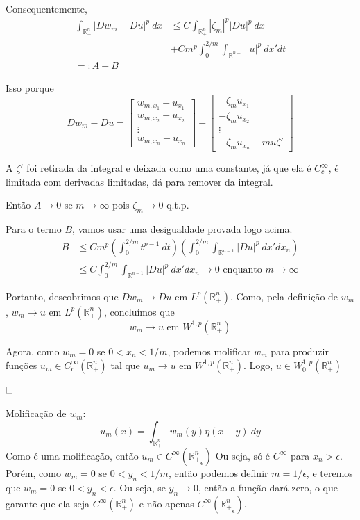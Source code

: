 \documentclass[11pt]{article}
\newcommand{\qed}{$\hfill\square$}
\newcommand{\R}{\mathbb{R}}
\newcommand{\e}{\epsilon}
\begin{document}
Consequentemente, \begin{align*}
	 \int_{\R^n_+} |Dw_m - Du|^p\ dx &\leq C \int_{\R^n_+} |\zeta_m|^p |Du|^p \ dx  \\
	  & +Cm^p \int_0^{2/m} \int_{\R^{n-1}} |u|^p \ dx'dt \\
	 =: A + B
\end{align*}

Isso porque \[ Dw_m - Du = \begin{bmatrix}
	w_{m, x_1} - u_{x_1} \\
		w_{m, x_2} - u_{x_2} \\
	\vdots \\
	w_{m, x_n} - u_{x_n}
\end{bmatrix}  - \begin{bmatrix}
- \zeta_m u_{x_1} \\
-\zeta_m u_{x_2} \\
\vdots \\
-\zeta_m u_{x_n} - mu\zeta'
\end{bmatrix}\] 

A $ \zeta' $ foi retirada da integral e deixada como uma constante, já que ela é $C^\infty_c$, é limitada com derivadas limitadas, dá para remover da integral.


Então $A\rightarrow 0$ se $m\rightarrow \infty$ pois $\zeta_m \rightarrow 0$ q.t.p.

Para o termo $B$, vamos usar uma desigualdade provada logo acima. \begin{align*}
	B &\leq C m^p \left(\int_0^{2/m} t^{p-1}\ dt\right)\left(\int_0^{2/m} \int_{\R^{n-1}} |Du|^p \ dx' dx_n\right) \\
	&\leq C \int_0^{2/m} \int_{\R^{n-1}} |Du|^p \ dx'dx_n \rightarrow 0 \text{ enquanto } m \rightarrow \infty
\end{align*}

Portanto, descobrimos que $ Dw_m \rightarrow Du \text{ em } L^{p}(\R^n_+)$. Como, pela definição de $w_m$, $w_m\rightarrow u \text{ em } L^p(\R^n_+)$, concluímos que \[ w_m \rightarrow u \text{ em } W^{1,p}(\R^n_+) \]

Agora, como $ w_m=0 $ se $ 0 < x_n < 1/m $, podemos molificar $ w_m $ para produzir funções $ u_m \in C^\infty_c(\R^n_+) $ tal que $ u_m \rightarrow u \text{ em } W^{1,p}(\R^n_+)$. Logo, $ u \in W^{1,p}_0 (\R^n_+) $

\qed

Molificação de $w_m$: \[ u_m(x) = \int_{\R^n_+} w_m(y) \eta(x-y)\ dy \] Como é uma molificação, então $u_m \in C^\infty({\R^n_+}_\e)$ Ou seja, só é $C^\infty$ para $x_n> \e$. Porém, como $w_m=0$ se $0 < y_n < 1/m$, então podemos definir $m=1/\e$, e teremos que $w_m=0$ se $0 < y_n < \e$. Ou seja, se $y_n \rightarrow 0$, então a função dará zero, o que garante que ela seja $C^\infty({\R^n_+})$ e não apenas $C^\infty({\R^n_+}_\e)$.
\end{document}
